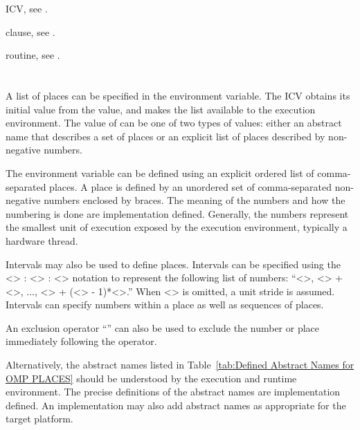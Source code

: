 \begin{crossrefs}
\item {} ICV, see .

\item {} clause,
see .

\item {} routine, see .
\end{crossrefs}



\section{}
\label{sec:OMP_PLACES}
A list of places can be specified in the  environment
variable. The  ICV obtains its initial value
from the  value, and makes the list available to the
execution environment. The value of  can be one of
two types of values: either an abstract name that describes a set of places
or an explicit list of places described by non-negative numbers.

The  environment variable can be defined using an
explicit ordered list of comma-separated places. A place is defined by
an unordered set of comma-separated non-negative numbers enclosed by
braces. The meaning of the numbers and how the numbering is done are
implementation defined. Generally, the numbers represent the smallest
unit of execution exposed by the execution environment, typically a hardware
thread.

Intervals may also be used to define places. Intervals can be specified
using the <> : <> : <> notation
to represent the following list of numbers: ``<>,
<> + <>, ..., <> +
(<> - 1)*<>.'' When <> is omitted, a
unit stride is assumed. Intervals can specify numbers within a place as
well as sequences of places.

An exclusion operator ``\code{!}'' can also be used to exclude the number
or place immediately following the operator.

Alternatively, the abstract names listed in
Table~\ref{tab:Defined Abstract Names for OMP PLACES} should be understood
by the execution and runtime environment. The precise definitions of the
abstract names are implementation defined. An implementation may also add
abstract names as appropriate for the target platform.


